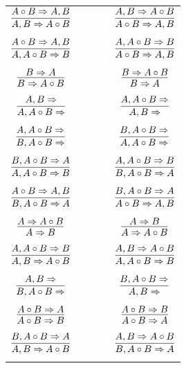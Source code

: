 \documentclass[11pt]{article}
\begin{document}
\begin{center}
\begin{tabular}{ccc}
$\infer{A, B\Rightarrow A\circ B}{A\circ B\Rightarrow A, B}$ & \ \ \ \ & $\infer{A\circ B\Rightarrow A, B}{A, B\Rightarrow A\circ B}$ \\
&& \\
$\infer{A, A\circ B\Rightarrow B}{A\circ B\Rightarrow A, B}$ && $\infer{A\circ B\Rightarrow A, B}{A, A\circ B\Rightarrow B}$ \\
&& \\
$\infer{B\Rightarrow A\circ B}{B\Rightarrow A}$ && $\infer{B\Rightarrow A}{B\Rightarrow A\circ B}$ \\
&& \\
$\infer{A, A\circ B\Rightarrow }{A, B\Rightarrow }$ && $\infer{A, B\Rightarrow }{A, A\circ B\Rightarrow }$ \\ 
&& \\
$\infer{B, A\circ B\Rightarrow }{A, A\circ B\Rightarrow }$ && $\infer{A, A\circ B\Rightarrow }{B, A\circ B\Rightarrow }$ \\
&& \\
$\infer{A, A\circ B\Rightarrow B}{B, A\circ B\Rightarrow A}$ && $\infer{B, A\circ B\Rightarrow A}{A, A\circ B\Rightarrow B}$ \\
&& \\
$\infer{B, A\circ B\Rightarrow A}{A\circ B\Rightarrow A, B}$ && $\infer{A\circ B\Rightarrow A, B}{B, A\circ B\Rightarrow A}$ \\
&& \\
$\infer{A\Rightarrow B}{A\Rightarrow A\circ B}$ && $\infer{A\Rightarrow A\circ B}{A\Rightarrow B}$ \\
&& \\
$\infer{A, B\Rightarrow A\circ B}{A, A\circ B\Rightarrow B}$ && $\infer{A, A\circ B\Rightarrow B}{A, B\Rightarrow A\circ B}$ \\
&& \\
$\infer{B, A\circ B\Rightarrow }{A, B\Rightarrow }$ && $\infer{A, B\Rightarrow }{B, A\circ B\Rightarrow }$ \\
&& \\
$\infer{A\circ B\Rightarrow B}{A\circ B\Rightarrow A}$ && $\infer{A\circ B\Rightarrow A}{A\circ B\Rightarrow B}$ \\
&& \\
$\infer{A, B\Rightarrow A\circ B}{B, A\circ B\Rightarrow A}$ && $\infer{B, A\circ B\Rightarrow A}{A, B\Rightarrow A\circ B}$ \\
&& \\
\end{tabular}

\end{center}
\end{document}
